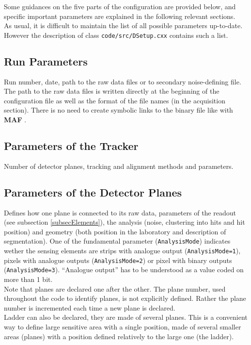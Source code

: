 \documentclass[a4paper, 12pt, twoside]{article}
\newcommand{\MAF}{{\bf MAF }}
\begin{document}
\noindent
Some guidances on the five parts of the configuration are provided below, and specific important parameters are explained in the following relevant sections.\\
As usual, it is difficult to maintain the list of all possible parameters up-to-date. However the description of class {\tt code/src/DSetup.cxx} contains such a list.

\subsection{Run Parameters}
Run number, date, path to the raw data files or to secondary noise-defining file.\\
The path to the raw data files is written directly at the beginning of the configuration file as well as the format of the file names (in the acquisition section). There is no need to create symbolic links to the binary file like with \MAF.

\subsection{Parameters of the Tracker}
Number of detector planes, tracking and alignment methods and parameters.

\subsection{Parameters of the Detector Planes}
Defines how one plane is connected to its raw data, parameters of the readout (see subsection \ref{subsecElements}), the analysis (noise, clustering into hits and hit position) and geometry (both position in the laboratory and description of segmentation). One of the fundamental parameter ({\tt AnalysisMode}) indicates wether the sensing elements are strips with analogue output ({\tt AnalysisMode=1}), pixels with analogue outputs ({\tt AnalysisMode=2}) or pixel with binary outputs ({\tt AnalysisMode=3}). ``Analogue output'' has to be understood as a value coded on more than 1 bit.\\ 

\noindent
Note that planes are declared one after the other. The plane number, used throughout the code to identify planes, is not explicitly defined. Rather the plane number is incremented each time a new plane is declared.\\
Ladder can also be declared, they are made of several planes. This is a convenient way to define large sensitive area with a single position, made of several smaller areas (planes) with a position defined relatively to the large one (the ladder).
\end{document}
